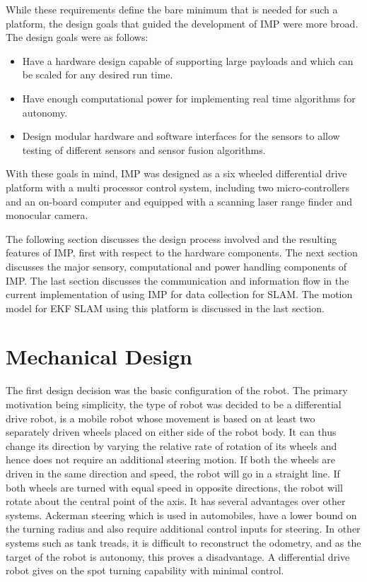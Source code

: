 While these requirements define the bare minimum that is needed for such a platform, the design goals that guided the development of IMP were more broad. The design goals were as follows:

\begin{itemize}
	\item Have a hardware design capable of supporting large payloads and which can be scaled for any desired run time.
	\item Have enough computational power for implementing real time algorithms for autonomy.
	\item Design modular hardware and software interfaces for the sensors to allow testing of different sensors and sensor fusion algorithms.
\end{itemize}

With these goals in mind, IMP was designed as a six wheeled differential drive platform with a multi processor control system, including two micro-controllers and an on-board computer and equipped with a scanning laser range finder and monocular camera. 

The following section discusses the design process involved and the resulting features of IMP, first with respect to the hardware components. The next section discusses the major sensory, computational and power handling components of IMP. The last section discusses the communication and information flow in the current implementation of using IMP for data collection for SLAM. The motion model for EKF SLAM using this platform is discussed in the last section. 

\section{Mechanical Design}

The first design decision was the basic configuration of the robot. The primary motivation being simplicity, the type of robot was decided to be a differential drive robot, is a mobile robot whose movement is based on at least two separately driven wheels placed on either side of the robot body. It can thus change its direction by varying the relative rate of rotation of its wheels and hence does not require an additional steering motion. If both the wheels are driven in the same direction and speed, the robot will go in a straight line. If both wheels are turned with equal speed in opposite directions, the robot will rotate about the central point of the axis. It has several advantages over other systems. Ackerman steering which is used in automobiles, have a lower bound on the turning radius and also require additional control inputs for steering. In other systems such as tank treads, it is difficult to reconstruct the odometry, and as the target of the robot is autonomy, this proves a disadvantage. A differential drive robot gives on the spot turning capability with minimal control.

